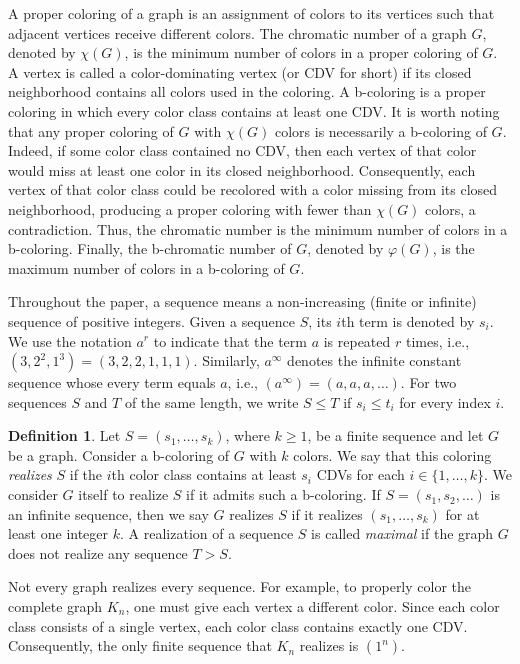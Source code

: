 \documentclass{article}
\theoremstyle{definition}
\newtheorem{definition}[theorem]{Definition}
\begin{document}
A proper coloring of a graph is an assignment of colors to its vertices such that adjacent vertices receive different colors. The chromatic number of a graph $G$, denoted by $\chi(G)$, is the minimum number of colors in a proper coloring of $G$.
A vertex is called a color-dominating vertex (or CDV for short) if its closed neighborhood contains all colors used in the coloring. A b-coloring is a proper coloring in which every color class contains at least one CDV. It is worth noting that any proper coloring of $G$ with $\chi(G)$ colors is necessarily a b-coloring of $G$. Indeed, if some color class contained no CDV, then each vertex of that color would miss at least one color in its closed neighborhood. Consequently, each vertex of that color class could be recolored with a color missing from its closed neighborhood, producing a proper coloring with fewer than $\chi(G)$ colors, a contradiction. Thus, the chromatic number is the minimum number of colors in a b-coloring. Finally, the b-chromatic number of $G$, denoted by $\varphi(G)$, is the maximum number of colors in a b-coloring of $G$.

Throughout the paper, a sequence means a non-increasing (finite or infinite) sequence of positive integers. Given a sequence $S$, its $i$th term is denoted by $s_i$. We use the notation $a^r$ to indicate that the term $a$ is repeated $r$ times, i.e., $(3,2^2,1^3)=(3,2,2,1,1,1)$. Similarly, $a^\infty$ denotes the infinite constant sequence whose every term equals $a$, i.e., $(a^\infty)=(a,a,a,\ldots)$. For two sequences $S$ and $T$ of the same length, we write $S\leq T$ if $s_i\leq t_i$ for every index $i$.

\begin{definition}\label{d:sequence}
Let $S=(s_1,\ldots,s_k)$, where $k\ge 1$, be a finite sequence and let $G$ be a graph.
Consider a b-coloring of $G$ with $k$ colors.
We say that this coloring {\em realizes} $S$ if the $i$th color class contains at least $s_i$ CDVs for each $i\in\{1,\ldots,k\}$.
We consider $G$ itself to realize $S$ if it admits such a b-coloring.
If $S=(s_1,s_2,\ldots)$ is an infinite sequence, then we say $G$ realizes $S$ if it realizes $(s_1,\ldots,s_k)$ for at least one integer $k$. A realization of a sequence $S$ is called {\em maximal} if the graph $G$ does not realize any sequence $T>S$.
\end{definition}

Not every graph realizes every sequence. For example, to properly color the complete graph $K_n$, one must give each vertex a different color. Since each color class consists of a single vertex, each color class contains exactly one CDV. Consequently, the only finite sequence that $K_n$ realizes is $(1^n)$.
\end{document}
